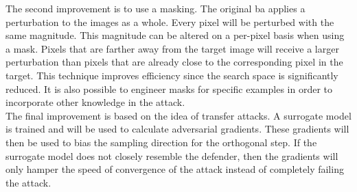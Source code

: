 The second improvement is to use a masking. The original \gls{ba} applies a perturbation to the images as a whole. Every pixel will be perturbed with the same magnitude. This magnitude can be altered on a per-pixel basis when using a mask. Pixels that are farther away from the target image will receive a larger perturbation than pixels that are already close to the corresponding pixel in the target. This technique improves efficiency since the search space is significantly reduced. It is also possible to engineer masks for specific examples in order to incorporate other knowledge in the attack.\\

The final improvement is based on the idea of transfer attacks. A surrogate model is trained and will be used to calculate adversarial gradients. These gradients will then be used to bias the sampling direction for the orthogonal step. If the surrogate model does not closely resemble the defender, then the gradients will only hamper the speed of convergence of the attack instead of completely failing the attack.


